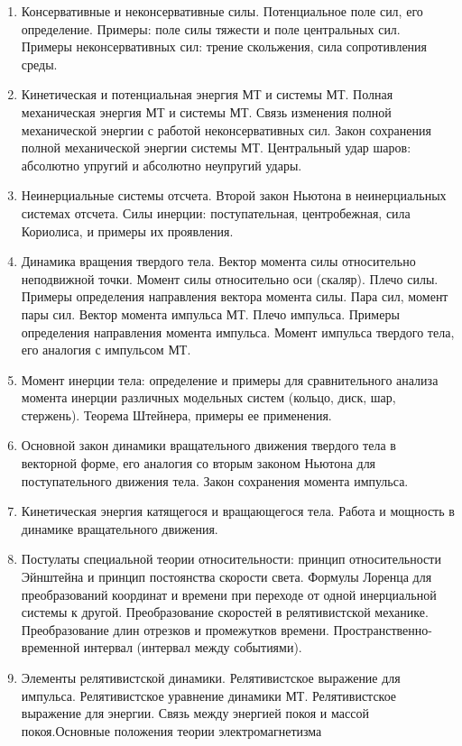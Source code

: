 \documentclass[12pt]{article}
\begin{document}
\begin{enumerate}
        \item Консервативные и неконсервативные силы. Потенциальное поле сил, его определение. Примеры: поле силы тяжести и поле центральных сил. Примеры неконсервативных сил: трение скольжения, сила сопротивления среды.
        \item Кинетическая и потенциальная энергия МТ и системы МТ. Полная механическая энергия МТ и системы МТ. Связь изменения полной механической энергии с работой неконсервативных сил. Закон сохранения полной механической энергии системы МТ. Центральный удар шаров: абсолютно упругий и абсолютно неупругий удары.
        \item Неинерциальные системы отсчета. Второй закон Ньютона в неинерциальных системах отсчета. Силы инерции: поступательная, центробежная, сила Кориолиса, и примеры их проявления.
        \item Динамика вращения твердого тела. Вектор момента силы относительно неподвижной точки. Момент силы относительно оси (скаляр). Плечо силы. Примеры определения направления вектора момента силы. Пара сил, момент пары сил. Вектор момента импульса МТ. Плечо импульса. Примеры определения направления момента импульса. Момент импульса твердого тела, его аналогия с импульсом МТ.
        \item Момент инерции тела: определение и примеры для сравнительного анализа момента инерции различных модельных систем (кольцо, диск, шар, стержень). Теорема Штейнера, примеры ее применения.
        \item Основной закон динамики вращательного движения твердого тела в векторной форме, его аналогия со вторым законом Ньютона для поступательного движения тела. Закон сохранения момента импульса.
        \item Кинетическая энергия катящегося и вращающегося тела. Работа и мощность в динамике вращательного движения.
        \item Постулаты специальной теории относительности: принцип относительности Эйнштейна и принцип постоянства скорости света. Формулы Лоренца для преобразований координат и времени при переходе от одной инерциальной системы к другой. Преобразование скоростей в релятивистской механике. Преобразование длин отрезков и промежутков времени. Пространственно-временной интервал (интервал между событиями).
        \item Элементы релятивистской динамики. Релятивистское выражение для импульса. Релятивистское уравнение динамики МТ. Релятивистское выражение для энергии. Связь между энергией покоя и массой покоя.Основные положения теории электромагнетизма

\end{enumerate}
\end{document}

